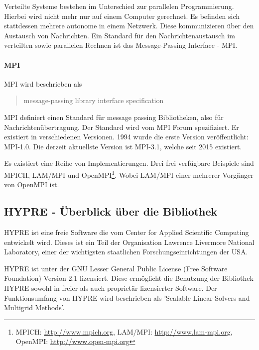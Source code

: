 \documentclass[a4paper,10pt]{article}
\numberwithin{figure}{section}
\numberwithin{table}{section}
\begin{document}
Verteilte Systeme bestehen im Unterschied zur parallelen Programmierung.
Hierbei wird nicht mehr nur auf einem Computer gerechnet.
Es befinden sich stattdessen mehrere autonome in einem Netzwerk\cite{CS61A}.
Diese kommunizieren über den Austausch von Nachrichten.
Ein Standard für den Nachrichtenaustausch im verteilten sowie parallelen Rechnen ist das Message-Passing Interface - MPI\cite{MPIhome}.

\paragraph{MPI}


MPI wird beschrieben als \blockquote[{\cite[1]{mpi31report}}]{message-passing library interface specification}.


MPI definiert einen Standard für message passing Bibliotheken, also für Nachrichtenübertragung.
Der Standard wird vom MPI Forum spezifiziert.
Er existiert in verschiedenen Versionen.
1994 wurde die erste Version veröffentlicht: MPI-1.0\cite[ii]{mpi31report}.
Die derzeit aktuellste Version ist MPI-3.1, welche seit 2015 existiert.



Es existiert eine Reihe von Implementierungen.
Drei frei verfügbare Beispiele sind MPICH, LAM/MPI und OpenMPI\footnote{MPICH: \url{http://www.mpich.org}, LAM/MPI: \url{http://www.lam-mpi.org}, OpenMPI: \url{http://www.open-mpi.org}}\cite[228]{ppRauberRuenger}.
Wobei LAM/MPI einer mehrerer Vorgänger von OpenMPI ist.




\subsection{HYPRE - Überblick über die Bibliothek}

HYPRE ist eine freie Software die vom Center for Applied Scientific Computing\cite{hypreCASC} entwickelt wird.
Dieses ist ein Teil der Organisation Lawrence Livermore National Laboratory\cite{hypreLLNL}, einer der wichtigsten staatlichen Forschungseinrichtungen der USA\cite{hypreDownload}.

HYPRE ist unter der GNU Lesser General Public License (Free Software Foundation) Version 2.1 lizensiert.
Diese ermöglicht die Benutzung der Bibliothek HYPRE sowohl in freier als auch proprietär lizensierter Software.
Der Funktionsumfang von HYPRE wird beschrieben als 'Scalable Linear Solvers and Multigrid Methods'.
\end{document}
